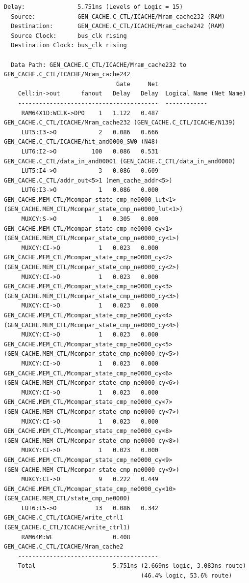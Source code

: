 \documentclass[11pt,letterpaper,]{article}
\begin{document}
\begin{tiny}
\begin{verbatim}
Delay:               5.751ns (Levels of Logic = 15)
  Source:            GEN_CACHE.C_CTL/ICACHE/Mram_cache232 (RAM)
  Destination:       GEN_CACHE.C_CTL/ICACHE/Mram_cache242 (RAM)
  Source Clock:      bus_clk rising
  Destination Clock: bus_clk rising

  Data Path: GEN_CACHE.C_CTL/ICACHE/Mram_cache232 to GEN_CACHE.C_CTL/ICACHE/Mram_cache242
                                Gate     Net
    Cell:in->out      fanout   Delay   Delay  Logical Name (Net Name)
    ----------------------------------------  ------------
     RAM64X1D:WCLK->DPO    1   1.122   0.487  GEN_CACHE.C_CTL/ICACHE/Mram_cache232 (GEN_CACHE.C_CTL/ICACHE/N139)
     LUT5:I3->O            2   0.086   0.666  GEN_CACHE.C_CTL/ICACHE/hit_and0000_SW0 (N48)
     LUT6:I2->O          100   0.086   0.531  GEN_CACHE.C_CTL/data_in_and00001 (GEN_CACHE.C_CTL/data_in_and0000)
     LUT5:I4->O            3   0.086   0.609  GEN_CACHE.C_CTL/addr_out<5>1 (mem_cache_addr<5>)
     LUT6:I3->O            1   0.086   0.000  GEN_CACHE.MEM_CTL/Mcompar_state_cmp_ne0000_lut<1> (GEN_CACHE.MEM_CTL/Mcompar_state_cmp_ne0000_lut<1>)
     MUXCY:S->O            1   0.305   0.000  GEN_CACHE.MEM_CTL/Mcompar_state_cmp_ne0000_cy<1> (GEN_CACHE.MEM_CTL/Mcompar_state_cmp_ne0000_cy<1>)
     MUXCY:CI->O           1   0.023   0.000  GEN_CACHE.MEM_CTL/Mcompar_state_cmp_ne0000_cy<2> (GEN_CACHE.MEM_CTL/Mcompar_state_cmp_ne0000_cy<2>)
     MUXCY:CI->O           1   0.023   0.000  GEN_CACHE.MEM_CTL/Mcompar_state_cmp_ne0000_cy<3> (GEN_CACHE.MEM_CTL/Mcompar_state_cmp_ne0000_cy<3>)
     MUXCY:CI->O           1   0.023   0.000  GEN_CACHE.MEM_CTL/Mcompar_state_cmp_ne0000_cy<4> (GEN_CACHE.MEM_CTL/Mcompar_state_cmp_ne0000_cy<4>)
     MUXCY:CI->O           1   0.023   0.000  GEN_CACHE.MEM_CTL/Mcompar_state_cmp_ne0000_cy<5> (GEN_CACHE.MEM_CTL/Mcompar_state_cmp_ne0000_cy<5>)
     MUXCY:CI->O           1   0.023   0.000  GEN_CACHE.MEM_CTL/Mcompar_state_cmp_ne0000_cy<6> (GEN_CACHE.MEM_CTL/Mcompar_state_cmp_ne0000_cy<6>)
     MUXCY:CI->O           1   0.023   0.000  GEN_CACHE.MEM_CTL/Mcompar_state_cmp_ne0000_cy<7> (GEN_CACHE.MEM_CTL/Mcompar_state_cmp_ne0000_cy<7>)
     MUXCY:CI->O           1   0.023   0.000  GEN_CACHE.MEM_CTL/Mcompar_state_cmp_ne0000_cy<8> (GEN_CACHE.MEM_CTL/Mcompar_state_cmp_ne0000_cy<8>)
     MUXCY:CI->O           1   0.023   0.000  GEN_CACHE.MEM_CTL/Mcompar_state_cmp_ne0000_cy<9> (GEN_CACHE.MEM_CTL/Mcompar_state_cmp_ne0000_cy<9>)
     MUXCY:CI->O           9   0.222   0.449  GEN_CACHE.MEM_CTL/Mcompar_state_cmp_ne0000_cy<10> (GEN_CACHE.MEM_CTL/state_cmp_ne0000)
     LUT6:I5->O           13   0.086   0.342  GEN_CACHE.C_CTL/ICACHE/write_ctrl1 (GEN_CACHE.C_CTL/ICACHE/write_ctrl1)
     RAM64M:WE                 0.408          GEN_CACHE.C_CTL/ICACHE/Mram_cache2
    ----------------------------------------
    Total                      5.751ns (2.669ns logic, 3.083ns route)
                                       (46.4% logic, 53.6% route)
\end{verbatim}
\end{tiny}
\end{document}
